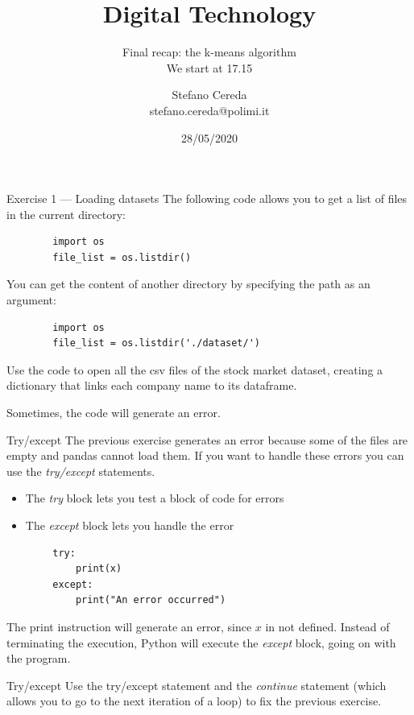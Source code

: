 \documentclass[aspectratio=169,]{beamer}
\title{Digital Technology}
\subtitle{Final recap: the k-means algorithm\\We start at 17.15}
\author{Stefano Cereda\\
stefano.cereda@polimi.it
}
\date{28/05/2020}
\institute[PoliMi]{Politecnico Milano}
\begin{document}
\begin{frame}
    \maketitle
\end{frame}

\begin{frame}[fragile]{Exercise 1 --- Loading datasets}
    The following code allows you to get a list of files in the current directory:
    \begin{verbatim}
        import os
        file_list = os.listdir()
    \end{verbatim}

    You can get the content of another directory by specifying the path as an argument:
    \begin{verbatim}
        import os
        file_list = os.listdir('./dataset/')
    \end{verbatim}

    Use the code to open all the csv files of the stock market dataset, creating a dictionary that links each company
    name to its dataframe.

    \pause
    Sometimes, the code will generate an error.
\end{frame}

\begin{frame}[fragile]{Try/except}
    The previous exercise generates an error because some of the files are empty and pandas cannot load them.
    If you want to handle these errors you can use the \emph{try/except} statements.

    \begin{itemize}
        \item The \emph{try} block lets you test a block of code for errors
        \item The \emph{except} block lets you handle the error
    \end{itemize}

    \begin{verbatim}
        try:
            print(x)
        except:
            print("An error occurred")
    \end{verbatim}
    The print instruction will generate an error, since $x$ in not defined. Instead of terminating the execution, Python
    will execute the \emph{except} block, going on with the program.
\end{frame}

\begin{frame}{Try/except}
    Use the try/except statement and the \emph{continue} statement (which allows you to go to the next iteration of a loop) to fix
    the previous exercise.
\end{frame}
\end{document}
